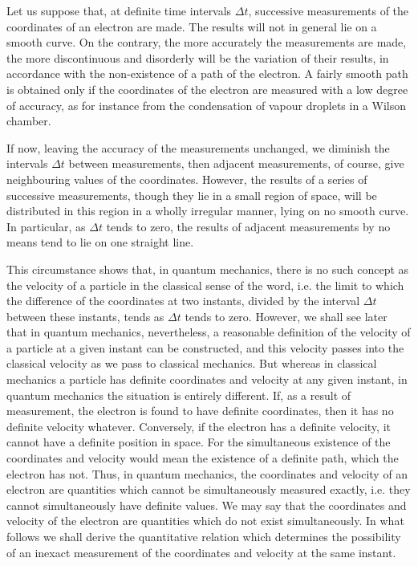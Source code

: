 Let us suppose that, at definite time intervals $ \Delta t $, successive measurements of the coordinates of an electron are made. The results will not in general lie on a smooth curve. On the contrary, the more accurately the measurements are made, the more discontinuous and disorderly will be the variation of their results, in accordance with the non-existence of a path of the electron. A fairly smooth path is obtained only if the coordinates of the electron are measured with a low degree of accuracy, as for instance from the condensation of vapour droplets in a Wilson chamber.


If now, leaving the accuracy of the measurements unchanged, we diminish the intervals $ \Delta t $ between measurements, then adjacent measurements, of course, give neighbouring values of the coordinates. However, the results of a series of successive measurements, though they lie in a small region of space, will be distributed in this region in a wholly irregular manner, lying on no smooth curve. In particular, as $ \Delta t $ tends to zero, the results of adjacent measurements by no means tend to lie on one straight line.


This circumstance shows that, in quantum mechanics, there is no such concept as the velocity of a particle in the classical sense of the word, i.e. the limit to which the difference of the coordinates at two instants, divided by the interval $ \Delta t $ between these instants, tends as $ \Delta t $ tends to zero. However, we shall see later that in quantum mechanics, nevertheless, a reasonable definition of the velocity of a particle at a given instant can be constructed, and this velocity passes into the classical velocity as we pass to classical mechanics. But whereas in classical mechanics a particle has definite coordinates and velocity at any given instant, in quantum mechanics the situation is entirely different. If, as a result of measurement, the electron is found to have definite coordinates, then it has no definite velocity whatever. Conversely, if the electron has a definite velocity, it cannot have a definite position in space. For the simultaneous existence of the coordinates and velocity would mean the existence of a definite path, which the electron has not. Thus, in quantum mechanics, the coordinates and velocity of an electron are quantities which cannot be simultaneously measured exactly, i.e. they cannot simultaneously have definite values. We may say that the coordinates and velocity of the electron are quantities which do not exist simultaneously. In what follows we shall derive the quantitative relation which determines the possibility of an inexact measurement of the coordinates and velocity at the same instant.


